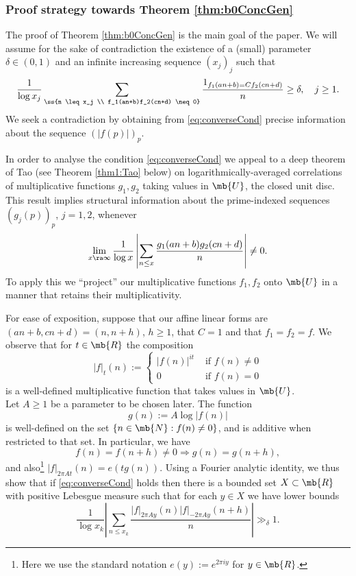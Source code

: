 \subsubsection{Proof strategy towards Theorem \ref{thm:b0ConcGen}} 
%
The proof of Theorem \ref{thm:b0ConcGen} is the main goal of the paper. 
%
We will assume for the sake of contradiction the existence of a (small) parameter $\delta \in (0,1)$ and an infinite increasing sequence $(x_j)_j$ such that
\begin{equation}\label{eq:converseCond}
\frac{1}{\log x_j} \sum_{\ss{n \leq x_j \\ f_1(an+b)f_2(cn+d) \neq 0}} \frac{1_{f_1(an+b) = Cf_2(cn+d)}}{n} \geq \delta, \quad j \geq 1.
\end{equation}
%
%
We seek a contradiction by obtaining from \eqref{eq:converseCond} precise information about the sequence $(|f(p)|)_p$. 

In order to analyse the condition \eqref{eq:converseCond} we 
%
appeal to a deep theorem of Tao \cite{Tao} (see Theorem \ref{thm1:Tao} below) on logarithmically-averaged correlations of multiplicative functions $g_1,g_2$ taking values in $\mb{U}$, the closed unit disc. This result implies structural information about the prime-indexed sequences $(g_j(p))_{p}$, $j = 1,2$, whenever 
%
$$
\lim_{x \ra \infty} \frac{1}{\log x} 
\left|
\sum_{n \leq x} \frac{g_1(an+b)g_2(cn+d)}{n}
\right| \neq 0.
$$
%
To apply this we ``project'' our multiplicative functions $f_1,f_2$ onto $\mb{U}$ in a manner that retains their multiplicativity. 
%
%
%
%
%

For ease of exposition, 
%
suppose that our affine linear forms are $(an+b,cn+d) = (n,n+h)$, $h \geq 1$, that $C = 1$ and that $f_1 = f_2 = f$. 
%
We observe that for $t \in \mb{R}$ 
%
the composition
$$
|f|_t(n) := \begin{cases} |f(n)|^{it} &\text{ if $f(n) \neq 0$} \\ 0 &\text{ if $f(n) = 0$} \end{cases}
%
$$
is a well-defined multiplicative function that takes values in $\mb{U}$. \\
%
%
%
%
Let $A \geq 1$ be a parameter to be chosen later. The function
%
$$
g(n) := 
%
A\log |f(n)| 
%
$$
is well-defined on the set $\{n \in \mb{N} : f(n) \neq 0\}$, and is additive when restricted to that set. In particular, we have
$$
f(n) = f(n+h) \neq 0 \Rightarrow g(n) = g(n+h),
$$
and also\footnote{Here we use the standard notation $e(y) := e^{2\pi i y}$ for $y \in \mb{R}$.} $|f|_{2\pi At}(n) = e(t g(n))$. Using a Fourier analytic identity, we thus show that if \eqref{eq:converseCond} holds then there is a bounded set $X \subset \mb{R}$ with positive Lebesgue measure such that for each $y \in X$ we have lower bounds 
$$
\frac{1}{\log x_k} \left|\sum_{n \leq x_k} \frac{|f|_{2\pi A y}(n) |f|_{-2\pi A y}(n+h)}{n}\right| \gg_{\delta} 1.
$$
